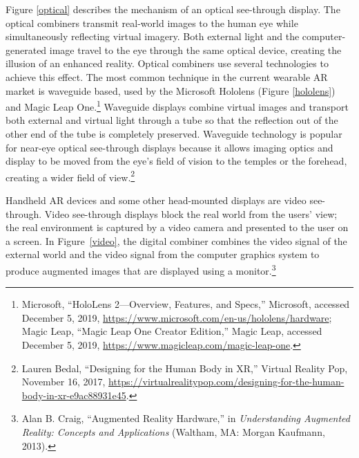 \begin{enumerate}
Figure \ref{optical} describes the mechanism of an optical see-through display. The optical combiners transmit real-world images to the human eye while simultaneously reflecting virtual imagery. Both external light and the computer-generated image travel to the eye through the same optical device, creating the illusion of an enhanced reality. Optical combiners use several technologies to achieve this effect. The most common technique in the current wearable AR market is waveguide based, used by the Microsoft Hololens (Figure \ref{hololens}) and Magic Leap One.\footnote{Microsoft, “HoloLens 2—Overview, Features, and Specs,” Microsoft, accessed December 5, 2019, \url{https://www.microsoft.com/en-us/hololens/hardware}; Magic Leap, “Magic Leap One Creator Edition,” Magic Leap, accessed December 5, 2019, \url{https://www.magicleap.com/magic-leap-one}.} Waveguide displays combine virtual images and transport both external and virtual light through a tube so that the reflection out of the other end of the tube is completely preserved. Waveguide technology is popular for near-eye optical see-through displays because it allows imaging optics and display to be moved from the eye’s field of vision to the temples or the forehead, creating a wider field of view.\footnote{Lauren Bedal, “Designing for the Human Body in XR,” Virtual Reality Pop, November 16, 2017, \url{https://virtualrealitypop.com/designing-for-the-human-body-in-xr-e9ac88931e45}.}

\begin{figure}[!ht]
\end{figure}

Handheld AR devices and some other head-mounted displays are video see-through. Video see-through displays block the real world from the users’ view; the real environment is captured by a video camera and presented to the user on a screen. In Figure~\ref{video}, the digital combiner combines the video signal of the external world and the video signal from the computer graphics system to produce augmented images that are displayed using a monitor.\footnote{Alan B. Craig, “Augmented Reality Hardware,” in \textit{Understanding Augmented Reality: Concepts and Applications} (Waltham, MA: Morgan Kaufmann, 2013).}
	

\end{enumerate}
